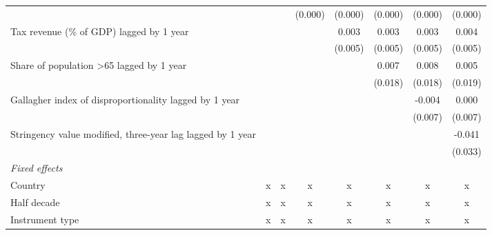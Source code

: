 \begin{tabular}{lccccccc}
                                                                               &         &              & (0.000)       & (0.000)       & (0.000)       & (0.000)       & (0.000)\\   
   Tax revenue (\% of GDP) lagged by 1 year                                    &         &              &               & 0.003         & 0.003         & 0.003         & 0.004\\   
                                                                               &         &              &               & (0.005)       & (0.005)       & (0.005)       & (0.005)\\   
   Share of population >65 lagged by 1 year                                    &         &              &               &               & 0.007         & 0.008         & 0.005\\   
                                                                               &         &              &               &               & (0.018)       & (0.018)       & (0.019)\\   
   Gallagher index of disproportionality lagged by 1 year                      &         &              &               &               &               & -0.004        & 0.000\\   
                                                                               &         &              &               &               &               & (0.007)       & (0.007)\\   
   Stringency value modified, three-year lag lagged by 1 year                  &         &              &               &               &               &               & -0.041\\   
                                                                               &         &              &               &               &               &               & (0.033)\\   
   \emph{Fixed effects}\\
   Country                                                                     & x       & x            & x             & x             & x             & x             & x\\  
   Half decade                                                                 & x       & x            & x             & x             & x             & x             & x\\  
   Instrument type                                                             & x       & x            & x             & x             & x             & x             & x\\  

\end{tabular}
